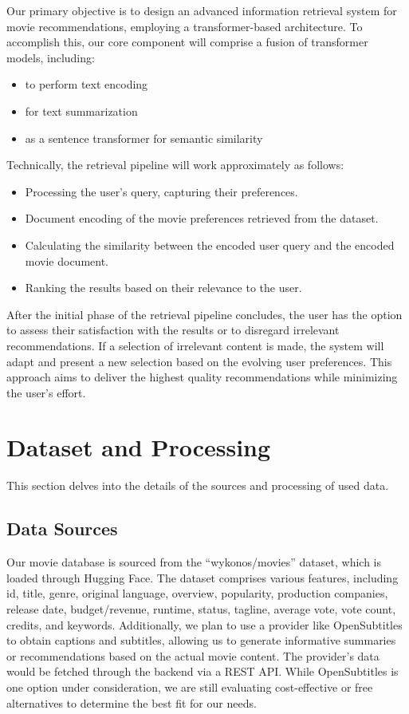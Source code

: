 \documentclass[12pt,a4paper]{article}
\begin{document}
  Our primary objective is to design an advanced information retrieval system for movie recommendations, employing a transformer-based architecture.
  To accomplish this, our core component will comprise a fusion of transformer models, including:
  \begin{itemize}
    \item to perform text encoding
    \item for text summarization
    \item as a sentence transformer for semantic similarity
  \end{itemize}

  \noindent Technically, the retrieval pipeline will work approximately as follows:
  \begin{itemize}
    \item Processing the user’s query, capturing their preferences.
    \item Document encoding of the movie preferences retrieved from the dataset.
    \item Calculating the similarity between the encoded user query and the encoded movie document.
    \item Ranking the results based on their relevance to the user.
  \end{itemize}

  \noindent After the initial phase of the retrieval pipeline concludes, the user has the option to assess their satisfaction with the results or to disregard irrelevant recommendations.
  If a selection of irrelevant content is made, the system will adapt and present a new selection based on the evolving user preferences.
  This approach aims to deliver the highest quality recommendations while minimizing the user’s effort.

  \section{Dataset and Processing}

  This section delves into the details of the sources and processing of used data.

  \subsection{Data Sources}

  Our movie database is sourced from the ``wykonos/movies'' dataset, which is loaded through Hugging Face.
  The dataset comprises various features, including id, title, genre, original language, overview, popularity, production companies, release date, budget/revenue, runtime, status, tagline, average vote, vote count, credits, and keywords.\newline\newline
  \noindent Additionally, we plan to use a provider like OpenSubtitles to obtain captions and subtitles, allowing us to generate informative summaries or recommendations based on the actual movie content. The provider’s data would be fetched through the backend via a REST API. While OpenSubtitles is one option under consideration, we are still evaluating cost-effective or free alternatives to determine the best fit for our needs.
\end{document}
